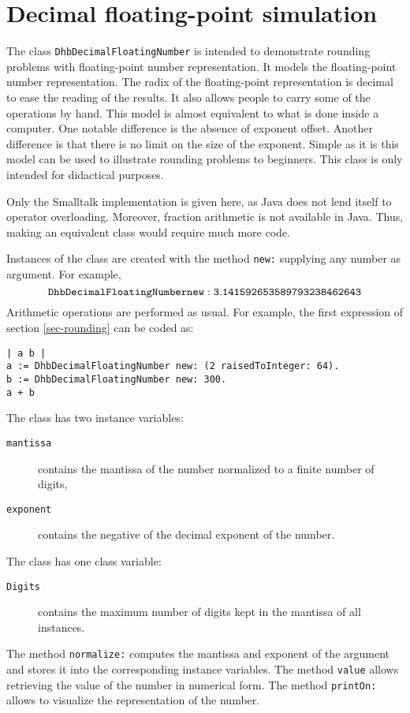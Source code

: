 \chapter{Decimal floating-point simulation}
\label{ch-fpSimul} The class {\tt DhbDecimalFloatingNumber} is
intended to demonstrate rounding problems with floating-point
number representation. It models the floating-point number
representation. The radix of the floating-point representation is
decimal to ease the reading of the results. It also allows people
to carry some of the operations by hand. This model is almost
equivalent to what is done inside a computer. One notable
difference is the absence of exponent offset. Another difference
is that there is no limit on the size of the exponent. Simple as
it is this model can be used to illustrate rounding problems to
beginners. This class is only intended for didactical purposes.

Only the Smalltalk implementation is given here, as Java does not
lend itself to operator overloading. Moreover, fraction arithmetic
is not available in Java. Thus, making an equivalent class would
require much more code.

Instances of the class are created with the method {\tt new:}
supplying any number as argument. For example, $${\tt
DhbDecimalFloatingNumber new: 3.141592653589793238462643}$$
Arithmetic operations are performed as usual. For example, the
first expression of section \ref{sec-rounding} can be coded as:
\begin{codeExample}
\begin{verbatim}
| a b |
a := DhbDecimalFloatingNumber new: (2 raisedToInteger: 64).
b := DhbDecimalFloatingNumber new: 300.
a + b
\end{verbatim}
\end{codeExample}
The class has two instance variables:
\begin{description}
\item[{\tt mantissa}] contains the mantissa of the number normalized to a finite number of
digits,
\item[{\tt exponent}] contains the negative of the decimal exponent of the number.
\end{description}
The class has one class variable:
\begin{description}
\item[{\tt Digits}] contains the maximum number of digits kept in the mantissa of all instances.
\end{description}
The method {\tt normalize:} computes the mantissa and exponent of
the argument and stores it into the corresponding instance
variables. The method {\tt value} allows retrieving the value of
the number in numerical form. The method {\tt printOn:} allows to
visualize the representation of the number.

